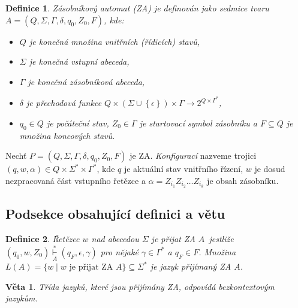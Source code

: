 \documentclass[twocolumn,11pt]{article}
\theoremstyle{plain}
\newtheorem{definition}{Definice}
\theoremstyle{plain}
\newtheorem{theorem}{Věta}
\begin{document}
\begin{definition}\label{def:za}
\emph{Zásobníkový automat} (ZA) je definován jako sedmice tvaru
$A = (Q, \Sigma, \Gamma, \delta, q_0, Z_0, F)$, kde:
\begin{itemize}
    \item $Q$ je konečná množina \emph{vnitřních (řídicích) stavů},
    \item $\Sigma$ je konečná \emph{vstupní abeceda},
    \item $\Gamma$ je konečná \emph{zásobníková abeceda},
    \item $\delta$ je \emph{přechodová funkce} $Q\times\left(\Sigma\cup\left\{\epsilon\right\}\right)\times\Gamma\rightarrow 2^{Q\times\Gamma^*}$,
    \item $q_0 \in Q$ je \emph{počáteční stav}, $Z_0 \in \Gamma$ je \emph{startovací symbol zásobníku} a $F \subseteq Q$ je množina \emph{koncových stavů}.
\end{itemize}
\end{definition}

Nechť $P = \left(Q, \Sigma, \Gamma, \delta, q_0, Z_0, F\right)$ je ZA. \emph{Konfigurací} nazveme trojici $(q, w, \alpha) \in Q \times \Sigma^* \times \Gamma^*$, kde $q$ je aktuální stav vnitřního
řízení, $w$ je dosud nezpracovaná část vstupního řetězce a $\alpha = Z_{i_1} Z_{i_2} \dots Z_{i_k}$ je obsah zásobníku.

\subsection{Podsekce obsahující definici a větu}
\begin{definition}
\emph{Řetězec $w$ nad abecedou $\Sigma$ je přijat ZA} $A$~jestliže $\left(q_0, w, Z_0\right) \underset{A}{\overset{*}{\vdash}} (q_F, \epsilon, \gamma)$ pro nějaké $\gamma \in \Gamma^*$ a $q_F \in F$.
Množina $L(A) = \{w \mid w \textrm{ je přijat ZA } A\} \subseteq \Sigma^*$ je \emph{jazyk přijímaný ZA} $A$.
\end{definition}
\begin{theorem}
Třída jazyků, které jsou přijímány ZA, odpovídá \emph{bezkontextovým jazykům}.
\end{theorem}
\end{document}
